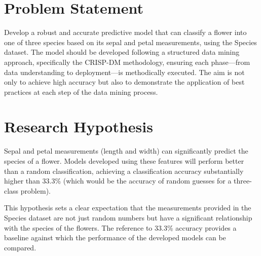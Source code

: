 \documentclass{article}
\begin{document}
\section{Problem Statement }
Develop a robust and accurate predictive model that can classify a flower into one of three species based on its sepal and petal measurements, using the Species dataset. The model should be developed following a structured data mining approach, specifically the CRISP-DM methodology, ensuring each phase—from data understanding to deployment—is methodically executed. The aim is not only to achieve high accuracy but also to demonstrate the application of best practices at each step of the data mining process.

\section{Research Hypothesis}
Sepal and petal measurements (length and width) can significantly predict the species of a flower. Models developed using these features will perform better than a random classification, achieving a classification accuracy substantially higher than 33.3\% (which would be the accuracy of random guesses for a three-class problem).

This hypothesis sets a clear expectation that the measurements provided in the Species dataset are not just random numbers but have a significant relationship with the species of the flowers. The reference to 33.3\% accuracy provides a baseline against which the performance of the developed models can be compared.
\end{document}
